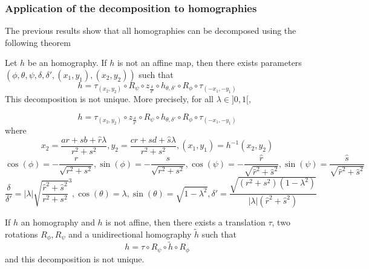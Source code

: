 \subsubsection{Application of the decomposition to homographies}
The previous results show that all homographies can be decomposed using the following theorem

\begin{thm}
Let $h$ be an homography. If $h$ is not an affine map, then there exists parameters $(\phi,\theta,\psi,\delta,\delta',(x_1,y_1),(x_2,y_2))$ such that
\begin{equation*}
h = \tau_{(x_2,y_2)} \circ R_{\psi} \circ z_{\frac{\delta}{\delta'}} \circ h_{\theta,\delta'} \circ R_{\phi} \circ \tau_{(-x_1,-y_1)}
\end{equation*}
This decomposition is not unique. More precisely, for all $\lambda \in ]0,1[$,

  \begin{equation*}
h = \tau_{(x_2,y_2)} \circ z_{\frac{\delta}{\delta'}}  \circ R_{\psi} \circ h_{\theta,\delta'} \circ R_{\phi} \circ \tau_{(-x_1,-y_1)}
  \end{equation*}
  where 
 \begin{equation*}
x_2=\frac{ar+sb+\hat r \lambda}{r^2 +s^2}, y_2=\frac{cr+sd+\hat s \lambda}{r^2 +s^2}, (x_1 , y_1) = h^{-1}(x_{2},y_{2})
  \end{equation*}
 \begin{equation*}
 \cos( \phi )= - \frac{r}{\sqrt{r^2 + s^2}}, \sin( \phi )= - \frac{s}{\sqrt{r^2 + s^2}},\cos( \psi ) =- \frac{\hat r}{\sqrt{\hat r^2 + \hat s^2}}, \sin( \psi ) = \frac{\hat s}{\sqrt{\hat r^2 + \hat s^2}}
 \end{equation*}
 \begin{equation*}
 \frac{\delta}{\delta'}=|\lambda|\sqrt{\frac{\hat r^2 + \hat s^2}{r^2 + s^2}}^{3}, \cos(\theta)=\lambda, \sin(\theta)=\sqrt{1-\lambda^2}, \delta'=  \frac{\sqrt{(r^2 + s^2)(1-\lambda^2)}}{|\lambda| (\hat r^2+\hat s^2)}
 \end{equation*}
\label{thepropdecomp}
\end{thm}

\begin{corollaire} If $h$ an homography and $h$ is not affine, then there exists a translation $\tau$, two rotations $R_\phi ,R_\psi$ and a unidirectional homography $\tilde{h}$ such that
\begin{equation}
h=\tau \circ R_\psi \circ \tilde{h} \circ R_\phi
\label{formule_decomposition_effective}
\end{equation}
and this decomposition is not unique.
\end{corollaire}

